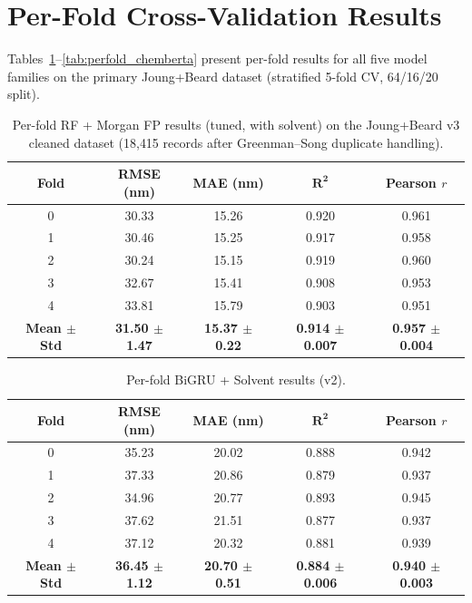 \documentclass[journal=jcisd8,manuscript=suppinfo]{achemso}
\begin{document}
\section{Per-Fold Cross-Validation Results}
\label{sec:perfold}

Tables~\ref{tab:perfold_rf}--\ref{tab:perfold_chemberta} present per-fold results for all five model families on the primary Joung+Beard dataset (stratified 5-fold CV, 64/16/20 split).

\begin{table}[htbp]
\centering
\caption{Per-fold RF + Morgan FP results (tuned, with solvent) on the Joung+Beard v3 cleaned dataset (18{,}415 records after Greenman--Song duplicate handling).}
\label{tab:perfold_rf}
\begin{tabular}{ccccc}
\toprule
\textbf{Fold} & \textbf{RMSE (nm)} & \textbf{MAE (nm)} & $\boldsymbol{R^2}$ & \textbf{Pearson $r$} \\
\midrule
0 & 30.33 & 15.26 & 0.920 & 0.961 \\
1 & 30.46 & 15.25 & 0.917 & 0.958 \\
2 & 30.24 & 15.15 & 0.919 & 0.960 \\
3 & 32.67 & 15.41 & 0.908 & 0.953 \\
4 & 33.81 & 15.79 & 0.903 & 0.951 \\
\midrule
\textbf{Mean $\pm$ Std} & \textbf{31.50 $\pm$ 1.47} & \textbf{15.37 $\pm$ 0.22} & \textbf{0.914 $\pm$ 0.007} & \textbf{0.957 $\pm$ 0.004} \\
\bottomrule
\end{tabular}
\end{table}

\begin{table}[htbp]
\centering
\caption{Per-fold BiGRU + Solvent results (v2).}
\label{tab:perfold_bigru}
\begin{tabular}{ccccc}
\toprule
\textbf{Fold} & \textbf{RMSE (nm)} & \textbf{MAE (nm)} & $\boldsymbol{R^2}$ & \textbf{Pearson $r$} \\
\midrule
0 & 35.23 & 20.02 & 0.888 & 0.942 \\
1 & 37.33 & 20.86 & 0.879 & 0.937 \\
2 & 34.96 & 20.77 & 0.893 & 0.945 \\
3 & 37.62 & 21.51 & 0.877 & 0.937 \\
4 & 37.12 & 20.32 & 0.881 & 0.939 \\
\midrule
\textbf{Mean $\pm$ Std} & \textbf{36.45 $\pm$ 1.12} & \textbf{20.70 $\pm$ 0.51} & \textbf{0.884 $\pm$ 0.006} & \textbf{0.940 $\pm$ 0.003} \\
\bottomrule
\end{tabular}
\end{table}
\end{document}
